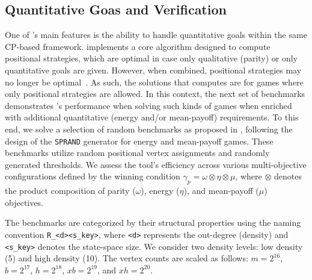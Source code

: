 \documentclass[a4paper,UKenglish,cleveref, autoref, thm-restate, anonymous]{lipics-v2021}
\begin{document}
\subsection{Quantitative Goas and Verification}

One of \nocq's main features is the ability to handle quantitative goals within the same CP-based framework. 
%
\nocq implements a core algorithm designed to compute positional strategies, which are optimal in case only qualitative (parity) or only quantitative goals are given. However, when combined, positional strategies may no longer be optimal~\cite{ChatterjeeHJ05,Chatterjee:2010}. As such, the solutions that \nocq computes are for games where only positional strategies are allowed. 
%
In this context, the next set of benchmarks demonstrates \nocq's performance when solving such kinds of games when enriched with additional quantitative (energy and/or mean-payoff) requirements.  
%
To this end, we solve a selection of random benchmarks as proposed in \cite{Chaloupka:2011}, following the design of the \texttt{SPRAND} generator \cite{CherkasskyBoris:1996} for energy and mean-payoff games. These benchmarks utilize random positional vertex assignments and randomly generated thresholds. We assess the tool's efficiency across various multi-objective configurations defined by the winning condition $\gamma_{p} = \omega \otimes \eta \otimes \mu$, where $\otimes$ denotes the product composition of parity ($\omega$), energy ($\eta$), and mean-payoff ($\mu$) objectives.

The benchmarks are categorized by their structural properties using the naming convention \texttt{R\_<d><s\_key>}, where \texttt{<d>} represents the out-degree (density) and \texttt{<s\_key>} denotes the state-space size. We consider two density levels: low density (5) and high density (10). The vertex counts are scaled as follows: $m = 2^{16}$, $b = 2^{17}$, $h = 2^{18}$, $xb = 2^{19}$, and $xh = 2^{20}$.
\end{document}
